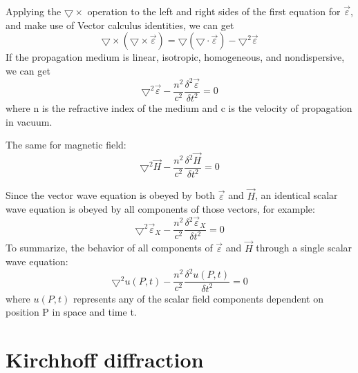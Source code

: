 \documentclass[../main.tex]{subfiles}
\begin{document}
	Applying the $\boldsymbol{\bigtriangledown}\times$ operation to the left and right sides of the first equation for $\vec{\varepsilon}$, and make use of Vector calculus identities, we can get
	\begin{equation}
	\boldsymbol{\bigtriangledown}\times(\boldsymbol{\bigtriangledown}\times\vec{\varepsilon})=\boldsymbol{\bigtriangledown}(\boldsymbol{\bigtriangledown}\cdot\vec{\varepsilon})-\boldsymbol{\bigtriangledown}^2\vec{\varepsilon}
	\end{equation}
	If the propagation medium is linear, isotropic, homogeneous, and nondispersive, we can get
	\begin{equation}
	\boldsymbol{\bigtriangledown}^2\vec{\varepsilon}-\frac{n^2}{c^2}\frac{\delta^2 \vec{\varepsilon}}{\delta t^2}=0
	\end{equation}
	where n is the refractive index of the medium and c is the velocity of propagation in vacuum.

	The same for magnetic field:
	\begin{equation}
	\boldsymbol{\bigtriangledown}^2\vec{H}-\frac{n^2}{c^2}\frac{\delta^2 \vec{H}}{\delta t^2}=0
	\end{equation}

	Since the vector wave equation is obeyed by both $\vec{\varepsilon}$ and $\vec{H}$, an identical scalar wave equation is obeyed by all components of those vectors, for example:
	\begin{equation}
	\boldsymbol{\bigtriangledown}^2\vec{\varepsilon}_X-\frac{n^2}{c^2}\frac{\delta^2 \vec{\varepsilon}_X}{\delta t^2}=0
	\end{equation}
	To summarize, the behavior of all components of $\vec{\varepsilon}$ and $\vec{H}$ through a single scalar wave equation:
	\begin{equation}
	\boldsymbol{\bigtriangledown}^2u(P,t)-\frac{n^2}{c^2}\frac{\delta^2 u(P,t)}{\delta t^2}=0
	\label{eq2-1}
	\end{equation}
	where $u(P,t)$ represents any of the scalar field components dependent on position P in space and time t.

	\section{Kirchhoff diffraction}
\end{document}
